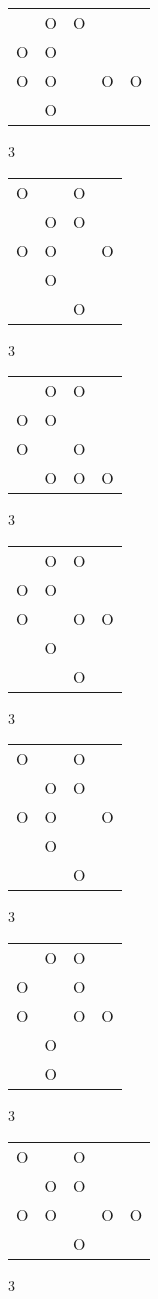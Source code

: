\begin{tabular}{|m{0.2cm}m{0.2cm}m{0.2cm}m{0.2cm}m{0.2cm}|}\hline
 &O&O& & \\
O&O& & & \\
O&O& &O&O\\
 &O& & & \\
\hline\end{tabular}3
\begin{tabular}{|m{0.2cm}m{0.2cm}m{0.2cm}m{0.2cm}|}\hline
O& &O& \\
 &O&O& \\
O&O& &O\\
 &O& & \\
 & &O& \\
\hline\end{tabular}3
\begin{tabular}{|m{0.2cm}m{0.2cm}m{0.2cm}m{0.2cm}|}\hline
 &O&O& \\
O&O& & \\
O& &O& \\
 &O&O&O\\
\hline\end{tabular}3
\begin{tabular}{|m{0.2cm}m{0.2cm}m{0.2cm}m{0.2cm}|}\hline
 &O&O& \\
O&O& & \\
O& &O&O\\
 &O& & \\
 & &O& \\
\hline\end{tabular}3
\begin{tabular}{|m{0.2cm}m{0.2cm}m{0.2cm}m{0.2cm}|}\hline
O& &O& \\
 &O&O& \\
O&O& &O\\
 &O& & \\
 & &O& \\
\hline\end{tabular}3
\begin{tabular}{|m{0.2cm}m{0.2cm}m{0.2cm}m{0.2cm}|}\hline
 &O&O& \\
O& &O& \\
O& &O&O\\
 &O& & \\
 &O& & \\
\hline\end{tabular}3
\begin{tabular}{|m{0.2cm}m{0.2cm}m{0.2cm}m{0.2cm}m{0.2cm}|}\hline
O& &O& & \\
 &O&O& & \\
O&O& &O&O\\
 & &O& & \\
\hline\end{tabular}3
